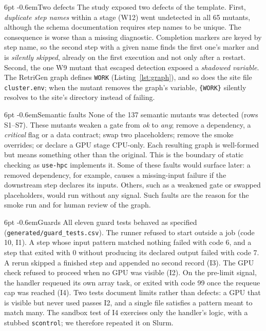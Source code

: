 \documentclass[pdflatex,sn-mathphys-num]{sn-jnl}
\makeatletter
\theoremstyle{thmstyletwo}%
\theoremstyle{thmstylethree}%
\newcommand{\tool}{\texttt{use-hpc}}
\newcommand{\code}[1]{\texttt{#1}}
\newcommand{\I}[1]{\textsf{I#1}}
\renewcommand\paragraph{\@startsection{paragraph}{4}{\z@}%
  {6pt \@plus 2pt \@minus 1pt}{-0.6em}{\normalfont\normalsize\bfseries}}
\makeatother
\begin{document}
\paragraph{Two defects} The study exposed two defects of the template. First, \emph{duplicate step names} within a stage (W12) went undetected in all 65 mutants, although the schema documentation requires step names to be unique. The consequence is worse than a missing diagnostic. Completion markers are keyed by step name, so the second step with a given name finds the first one's marker and is \emph{silently skipped}, already on the first execution and not only after a restart. Second, the one W9 mutant that escaped detection exposed a \emph{shadowed variable}. The RetriGen graph defines \code{WORK} (Listing~\ref{lst:graph}), and so does the site file \code{cluster.env}; when the mutant removes the graph's variable, \code{\{WORK\}} silently resolves to the site's directory instead of failing. %

\paragraph{Semantic faults} None of the 137 semantic mutants was detected (rows S1--S7). These mutants weaken a gate from \emph{ok} to \emph{any}; remove a dependency, a \emph{critical} flag or a data contract; swap two placeholders; remove the smoke overrides; or declare a GPU stage CPU-only. Each resulting graph is well-formed but means something other than the original. This is the boundary of static checking as \tool{} implements it. Some of these faults would surface later: a removed dependency, for example, causes a missing-input failure if the downstream step declares its inputs. Others, such as a weakened gate or swapped placeholders, would run without any signal. Such faults are the reason for the smoke run and for human review of the graph.

\paragraph{Guards} All eleven guard tests behaved as specified (\code{generated/guard\_tests.csv}). The runner refused to start outside a job (code 10, \I{1}). A step whose input pattern matched nothing failed with code 6, and a step that exited with 0 without producing its declared output failed with code 7. A rerun skipped a finished step and appended no second record (\I{3}). The GPU check refused to proceed when no GPU was visible (\I{2}). On the pre-limit signal, the handler requeued its own array task, or exited with code 99 once the requeue cap was reached (\I{4}). Two tests document limits rather than defects: a GPU that is visible but never used passes \I{2}, and a single file satisfies a pattern meant to match many. The sandbox test of \I{4} exercises only the handler's logic, with a stubbed \code{scontrol}; we therefore repeated it on Slurm.
\end{document}
